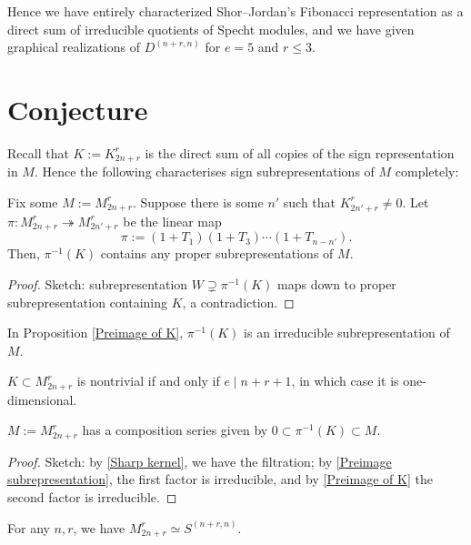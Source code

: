 \documentclass{amsart}
\begin{document}
Hence we have entirely characterized Shor--Jordan's Fibonacci representation \cite{Shor} as a direct sum of irreducible quotients of Specht modules, and we have given graphical realizations of $D^{(n+r,n)}$ for $e = 5$ and $r \leq 3$.

\section{Conjecture}\label{Conjecture Section}
Recall that $K := K_{2n + r}^r$ is the direct sum of all copies of the sign representation in $M$.
Hence the following characterises sign subrepresentations of $M$ completely:
\begin{proposition}\label{Preimage of K}
  Fix some $M := M_{2n + r}^r$.
  Suppose there is some $n'$ such that $K_{2n' + r}^r \neq 0$.
  Let $\pi:M_{2n + r}^r \twoheadrightarrow M_{2n' + r}^r$ be the linear map
  \[
    \pi := (1 + T_1)(1 + T_3)\cdots(1 + T_{n-n'}).
  \]
  Then, $\pi^{-1}(K)$ contains any proper subrepresentations of $M$.
\end{proposition}
\begin{proof}
  {\color{orange} Sketch: subrepresentation $W \supsetneq \pi^{-1}(K)$ maps down to proper subrepresentation containing $K$, a contradiction.}
\end{proof}
\begin{conjecture}\label{Preimage subrepresentation}
  In Proposition \ref{Preimage of K}, $\pi^{-1}(K)$ is an irreducible subrepresentation of $M$.
\end{conjecture}
\begin{conjecture}\label{Sharp kernel}
  $K \subset M_{2n + r}^r$ is nontrivial if and only if $e \mid n + r + 1$, in which case it is one-dimensional.
\end{conjecture} 
\begin{corollary}
  $M := M_{2n + r}^r$ has a composition series given by $0 \subset \pi^{-1}(K) \subset M$.
\end{corollary}
\begin{proof}
  {\color{orange} Sketch: by \ref{Sharp kernel}, we have the filtration;
  by \ref{Preimage subrepresentation}, the first factor is irreducible, and by \ref{Preimage of K} the second factor is irreducible.}
\end{proof}

\begin{conjecture}
  For any $n,r$, we have $M_{2n + r}^r \simeq S^{(n+r,n)}$.
\end{conjecture}
\end{document}
